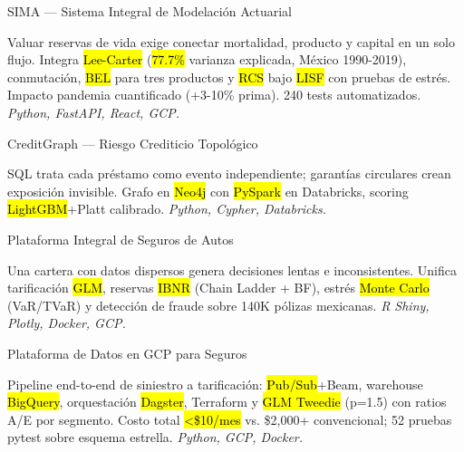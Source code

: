 \documentclass[10pt, letterpaper]{awesome-cv}
\begin{document}
\begin{cventries}

  \cventry
    {SIMA — Sistema Integral de Modelación Actuarial}
    {}
    {}
    {}
    {
      \begin{cvitems}
        \item {Valuar reservas de vida exige conectar mortalidad, producto y capital en un solo flujo. Integra \hl{Lee-Carter} (\hl{77.7\%} varianza explicada, México 1990-2019), conmutación, \hl{BEL} para tres productos y \hl{RCS} bajo \hl{LISF} con pruebas de estrés. Impacto pandemia cuantificado (+3-10\% prima). 240 tests automatizados. \textit{Python, FastAPI, React, GCP.}}
      \end{cvitems}
    }

  \cventry
    {CreditGraph — Riesgo Crediticio Topológico}
    {}
    {}
    {}
    {
      \begin{cvitems}
        \item {SQL trata cada préstamo como evento independiente; garantías circulares crean exposición invisible. Grafo en \hl{Neo4j} con \hl{PySpark} en Databricks, scoring \hl{LightGBM}+Platt calibrado. \textit{Python, Cypher, Databricks.}}
      \end{cvitems}
    }

  \cventry
    {Plataforma Integral de Seguros de Autos}
    {}
    {}
    {}
    {
      \begin{cvitems}
        \item {Una cartera con datos dispersos genera decisiones lentas e inconsistentes. Unifica tarificación \hl{GLM}, reservas \hl{IBNR} (Chain Ladder + BF), estrés \hl{Monte Carlo} (VaR/TVaR) y detección de fraude sobre 140K pólizas mexicanas. \textit{R Shiny, Plotly, Docker, GCP.}}
      \end{cvitems}
    }

  \cventry
    {Plataforma de Datos en GCP para Seguros}
    {}
    {}
    {}
    {
      \begin{cvitems}
        \item {Pipeline end-to-end de siniestro a tarificación: \hl{Pub/Sub}+Beam, warehouse \hl{BigQuery}, orquestación \hl{Dagster}, Terraform y \hl{GLM Tweedie} (p=1.5) con ratios A/E por segmento. Costo total \hl{<\$10/mes} vs. \$2,000+ convencional; 52 pruebas pytest sobre esquema estrella. \textit{Python, GCP, Docker.}}
      \end{cvitems}
    }

\end{cventries}
\end{document}
